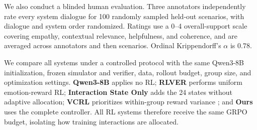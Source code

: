 \documentclass[letterpaper]{article}
\begin{document}
We also conduct a blinded human evaluation. Three annotators independently rate every system dialogue for 100 randomly sampled held-out scenarios, with dialogue and system order randomized. Ratings use a 0--4 overall-support scale covering empathy, contextual relevance, helpfulness, and coherence, and are averaged across annotators and then scenarios. Ordinal Krippendorff's $\alpha$ is 0.78.

We compare all systems under a controlled protocol with the same Qwen3-8B initialization, frozen simulator and verifier, data, rollout budget, group size, and optimization settings. \textbf{Qwen3-8B} applies no RL; \textbf{RLVER} performs uniform emotion-reward RL; \textbf{Interaction State Only} adds the 24 states without adaptive allocation; \textbf{VCRL} prioritizes within-group reward variance \cite{vcrl2025}; and \textbf{Ours} uses the complete controller. All RL systems therefore receive the same GRPO budget, isolating how training interactions are allocated.
\end{document}
